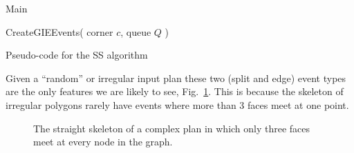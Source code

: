 \begin{algorithm} [htb]
\begin{footnotesize}
  Main \Begin{
   $Q$ = new priority queue\; 
   $sweepZ$ = 0\;

    \ForEach{ corner $c$ in active plan } {
        CreateGIEEvents ( $c$, $Q$ )\;
    }

    \While { !$Q$.empty() } {
        event = FindNextEvent($Q$)\;%

        event.removePlanesNotInActiveplan()\;
        event.removePlanesOutOfBounds()\;
	\If { event.getPlanes().size() $\ge$ 3) and \newline
              event.z $\ge$ $sweepZ$ } 
        {
            $newCorners$ = HandleEvent( event )\;
            
            $sweepZ$ = event.$z$\;
            \ForEach{ corner $c$ in newCorners }{
              CreateEvents($c$, $Q$)\;
            }
        }
    }

    \ForEach{ edge $e$ in input plan } {
         ReconstructFace ($e$)\;
    }
}

  CreateGIEEvents( corner $c$, queue $Q$ ) 
\end{footnotesize}
  \caption{Pseudo-code for the SS algorithm}
  \label{code:skelcode}
\end{algorithm}


Given a ``random'' or irregular input plan these two (split and edge) event types are the only features we are likely to see, Fig.~\ref{fig:wss_complex_three_event}. This is because the skeleton of irregular polygons rarely have events where more than 3 faces meet at one point. 

\begin{figure}
  \centering
  \def\svgwidth{0.85\columnwidth}
  
  \caption[A complex straight skeleton]{\label{fig:wss_complex_three_event} The straight skeleton of a complex plan in which only three faces meet at every node in the graph.}
\end{figure}

